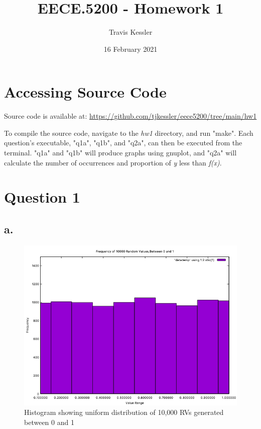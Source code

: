 \documentclass{report}
\title{EECE.5200 - Homework 1}
\author{Travis Kessler}
\date{16 February 2021}
\begin{document}
	\maketitle
	\newpage

	\lstset{frame=lines}

	\section*{Accessing Source Code}
	
	Source code is available at: \href{https://github.com/tjkessler/eece5200/tree/main/hw1}{https://github.com/tjkessler/eece5200/tree/main/hw1}
	
	\textit{}
	
	\noindent To compile the source code, navigate to the \textit{hw1} directory, and run "make". Each question's executable, "q1a", "q1b", and "q2a", can then be executed from the terminal. "q1a" and "q1b" will produce graphs using gnuplot, and "q2a" will calculate the number of occurrences and proportion of \textit{y} less than \textit{f(x)}.
	
	\section*{Question 1}
	
	\subsection*{a.}
	
	\begin{figure}[!ht]
		\centering
		\includegraphics[scale=0.7]{figures/q1a_results.png}
		\caption{Histogram showing uniform distribution of 10,000 RVs generated between 0 and 1}
	\end{figure}
\end{document}
